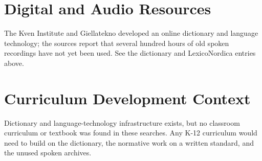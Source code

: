 \documentclass[12pt]{article}
\begin{document}
\section{Digital and Audio Resources}
The Kven Institute and Giellatekno developed an online dictionary and language technology; the sources report that several hundred hours of old spoken recordings have not yet been used. See the dictionary and LexicoNordica entries above.

\section{Curriculum Development Context}
Dictionary and language-technology infrastructure exists, but no classroom curriculum or textbook was found in these searches. Any K-12 curriculum would need to build on the dictionary, the normative work on a written standard, and the unused spoken archives.
\end{document}
